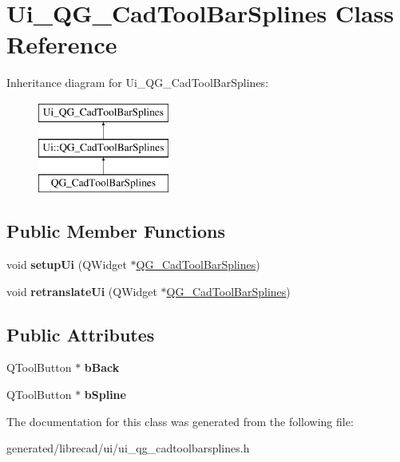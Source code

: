 \hypertarget{classUi__QG__CadToolBarSplines}{\section{Ui\-\_\-\-Q\-G\-\_\-\-Cad\-Tool\-Bar\-Splines Class Reference}
\label{classUi__QG__CadToolBarSplines}
}
Inheritance diagram for Ui\-\_\-\-Q\-G\-\_\-\-Cad\-Tool\-Bar\-Splines\-:\begin{figure}[H]
\begin{center}
\leavevmode
\includegraphics[height=3.000000cm]{classUi__QG__CadToolBarSplines}
\end{center}
\end{figure}
\subsection*{Public Member Functions}
\begin{DoxyCompactItemize}
\item 
\hypertarget{classUi__QG__CadToolBarSplines_a844e680475d0bbe672013bfbf19c5ff2}{void {\bfseries setup\-Ui} (Q\-Widget $\ast$\hyperlink{classQG__CadToolBarSplines}{Q\-G\-\_\-\-Cad\-Tool\-Bar\-Splines})}\label{classUi__QG__CadToolBarSplines_a844e680475d0bbe672013bfbf19c5ff2}

\item 
\hypertarget{classUi__QG__CadToolBarSplines_a4501e36cedb50b8311411eff73a604d2}{void {\bfseries retranslate\-Ui} (Q\-Widget $\ast$\hyperlink{classQG__CadToolBarSplines}{Q\-G\-\_\-\-Cad\-Tool\-Bar\-Splines})}\label{classUi__QG__CadToolBarSplines_a4501e36cedb50b8311411eff73a604d2}

\end{DoxyCompactItemize}
\subsection*{Public Attributes}
\begin{DoxyCompactItemize}
\item 
\hypertarget{classUi__QG__CadToolBarSplines_a04e391028e68858c68b710e66695c33a}{Q\-Tool\-Button $\ast$ {\bfseries b\-Back}}\label{classUi__QG__CadToolBarSplines_a04e391028e68858c68b710e66695c33a}

\item 
\hypertarget{classUi__QG__CadToolBarSplines_ab8f197169aa42cfe87bb95434c4bd4a4}{Q\-Tool\-Button $\ast$ {\bfseries b\-Spline}}\label{classUi__QG__CadToolBarSplines_ab8f197169aa42cfe87bb95434c4bd4a4}

\end{DoxyCompactItemize}


The documentation for this class was generated from the following file\-:\begin{DoxyCompactItemize}
\item 
generated/librecad/ui/ui\-\_\-qg\-\_\-cadtoolbarsplines.\-h\end{DoxyCompactItemize}
